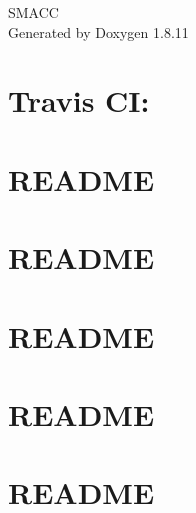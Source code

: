 \documentclass[twoside]{book}
\newcommand{\+}{\discretionary{\mbox{\scriptsize$\hookleftarrow$}}{}{}}
\newcommand{\clearemptydoublepage}{%
  \newpage{\pagestyle{empty}\cleardoublepage}%
}
\begin{document}
\hypersetup{pageanchor=false,
             bookmarksnumbered=true,
             pdfencoding=unicode
            }
\begin{titlepage}
\vspace*{7cm}
\begin{center}%
{\Large S\+M\+A\+CC }\\
\vspace*{1cm}
{\large Generated by Doxygen 1.8.11}\\
\end{center}
\end{titlepage}
\clearemptydoublepage
\tableofcontents
\clearemptydoublepage
{}
\hypersetup{pageanchor=true}

\chapter{Travis CI\+:}
\label{md_README}
\hypertarget{md_README}{}

\chapter{R\+E\+A\+D\+ME}
\label{md_smacc_client_library_battery_monitor_client_README}
\hypertarget{md_smacc_client_library_battery_monitor_client_README}{}

\chapter{R\+E\+A\+D\+ME}
\label{md_smacc_client_library_keyboard_client_README}
\hypertarget{md_smacc_client_library_keyboard_client_README}{}

\chapter{R\+E\+A\+D\+ME}
\label{md_smacc_client_library_microstrain_mips_client_README}
\hypertarget{md_smacc_client_library_microstrain_mips_client_README}{}

\chapter{R\+E\+A\+D\+ME}
\label{md_smacc_client_library_move_base_z_client_README}
\hypertarget{md_smacc_client_library_move_base_z_client_README}{}

\chapter{R\+E\+A\+D\+ME}
\label{md_smacc_client_library_multirole_sensor_client_README}
\hypertarget{md_smacc_client_library_multirole_sensor_client_README}{}

\end{document}
